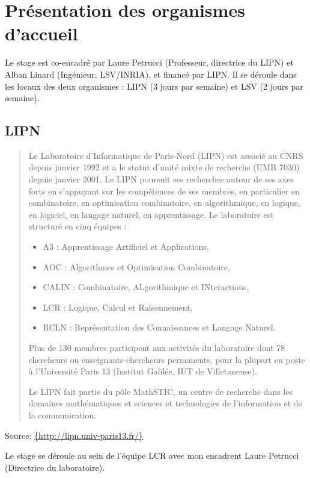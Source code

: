 \documentclass{report}
\begin{document}
\section{Présentation des organismes d'accueil}

Le stage est co-encadré par Laure Petrucci (Professeur, directrice du LIPN)
et Alban Linard (Ingénieur, LSV/INRIA), et financé par LIPN. Il se déroule
dans les locaux des deux organismes : LIPN (3 jours par semaine) et LSV (2 jours par semaine).

\subsection{LIPN}

\begin{quotation}
Le Laboratoire d'Informatique de Paris-Nord (LIPN) est associé au CNRS depuis janvier 1992 et a le statut d'unité mixte 
de recherche  (UMR 7030) depuis janvier 2001. Le LIPN poursuit ses recherches autour de ses axes forts en s'appuyant 
sur les compétences de ses membres, en particulier en combinatoire, en optimisation combinatoire, en algorithmique, 
en logique, en logiciel, en langage naturel, en apprentissage. Le laboratoire est structuré en cinq équipes :\\
\begin{itemize}
     \item A3 : Apprentissage Artificiel et Applications,
     \item AOC : Algorithmes et Optimisation Combinatoire,
     \item CALIN : Combinatoire, ALgorithmique et INteractions,
     \item LCR : Logique, Calcul et Raisonnement,
     \item RCLN : Représentation des Connaissances et Langage Naturel. 
\end{itemize}

Plus de 130 membres participent aux activités du laboratoire dont 78 chercheurs ou enseignants-chercheurs permanents, 
pour la plupart en poste à l'Université Paris 13 (Institut Galilée, IUT de Villetaneuse).
    
Le LIPN fait partie du pôle MathSTIC, un centre de recherche dans les domaines mathématiques et sciences et 
technologies de l'information et de la communication.
\end{quotation}
\hfill{Source: \url{{http://lipn.univ-paris13.fr/}}}

\medskip

Le stage se déroule au sein de l'équipe LCR avec mon encadrent Laure Petrucci (Directrice du laboratoire).
\end{document}

